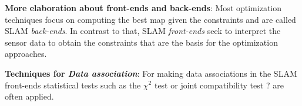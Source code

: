 \textbf{More elaboration about front-ends and back-ends}: Most optimization techniques focus on computing the best map given the constraints and are called SLAM \emph{back-ends}. In contrast to that, SLAM \emph{front-ends} seek to interpret the sensor data to obtain the constraints that are the basis for the optimization approaches.

\textbf{Techniques for \emph{Data association}}: For making data associations in the SLAM front-ends statistical tests such as the $\chi^2$ test or joint compatibility test {\color{red} ?} are often applied.


